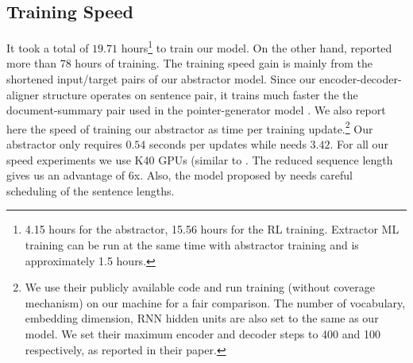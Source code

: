 \documentclass[11pt,a4paper]{article}
\begin{document}
\subsection{Training Speed}
It took a total of $19.71$ hours\footnote{4.15 hours for the abstractor, 15.56 hours for the RL training. Extractor ML training can be run at the same time with abstractor training and is approximately 1.5 hours.
} to train our model. On the other hand, \citet{get_to_the_point} reported more than 78 hours of training.
The training speed gain is mainly from the shortened input/target pairs of our abstractor model. 
Since our encoder-decoder-aligner structure operates on sentence pair, it trains much faster the the document-summary pair used in the pointer-generator model \citep{get_to_the_point}.
We also report here the speed of training our abstractor as time per training update.\footnote{We use their publicly available code and run training (without coverage mechanism) on our machine for a fair comparison.
The number of vocabulary, embedding dimension, RNN hidden units are also set to the same as our model. We set their maximum encoder and decoder steps to 400 and 100 respectively, as reported in their paper.
}
Our abstractor only requires $0.54$ seconds per updates while \citet{get_to_the_point} needs $3.42$.
For all our speed experiments we use K40 GPUs (similar to \citet{get_to_the_point}.
The reduced sequence length gives us an advantage of 6x.
Also, the model proposed by \citet{get_to_the_point} needs careful scheduling of the sentence lengths.  
\end{document}

